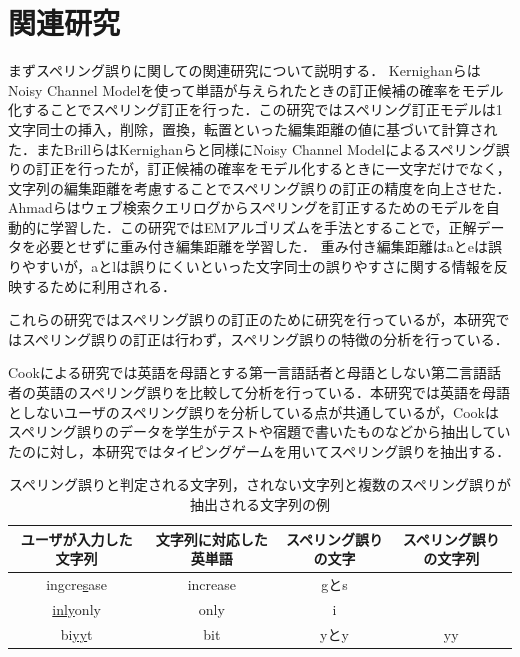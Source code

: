 \documentclass{jarticle}
\begin{document}
\section{関連研究}
まずスペリング誤りに関しての関連研究について説明する．
KernighanらはNoisy Channel Modelを使って単語が与えられたときの訂正候補の確率をモデル化することでスペリング訂正を行った\cite{kernighan1990spelling}．この研究ではスペリング訂正モデルは1文字同士の挿入，削除，置換，転置といった編集距離の値に基づいて計算された．またBrillらはKernighanらと同様にNoisy Channel Modelによるスペリング誤りの訂正を行ったが，訂正候補の確率をモデル化するときに一文字だけでなく，文字列の編集距離を考慮することでスペリング誤りの訂正の精度を向上させた\cite{brill2000improved}．
Ahmadらはウェブ検索クエリログからスペリングを訂正するためのモデルを自動的に学習した\cite{ahmad2005learning}．この研究ではEMアルゴリズムを手法とすることで，正解データを必要とせずに重み付き編集距離を学習した．
重み付き編集距離はaとeは誤りやすいが，aとlは誤りにくいといった文字同士の誤りやすさに関する情報を反映するために利用される．

これらの研究ではスペリング誤りの訂正のために研究を行っているが，本研究ではスペリング誤りの訂正は行わず，スペリング誤りの特徴の分析を行っている．

Cookによる研究\cite{cook1997l2}では英語を母語とする第一言語話者と母語としない第二言語話者の英語のスペリング誤りを比較して分析を行っている．本研究では英語を母語としないユーザのスペリング誤りを分析している点が共通しているが，Cookはスペリング誤りのデータを学生がテストや宿題で書いたものなどから抽出していたのに対し，本研究ではタイピングゲームを用いてスペリング誤りを抽出する．

 \begin{table}[t]
  \small
  \begin{center}
   \caption{スペリング誤りと判定される文字列，されない文字列と複数のスペリング誤りが抽出される文字列の例}
   \begin{tabular}{|c|c|c|c|} \hline
       	ユーザが入力した文字列 & 文字列に対応した英単語 & スペリング誤りの文字 & スペリング誤りの文字列\\ \hline
		in\underline{g}cre\underline{s}ase & increase & gとs & \\ \hline
		\underline{inly}only & only & i & \\ \hline
	    bi\underline{yy}t & bit & yとy & yy\\ \hline
   \end{tabular}
  \end{center}
 \end{table}
\end{document}
